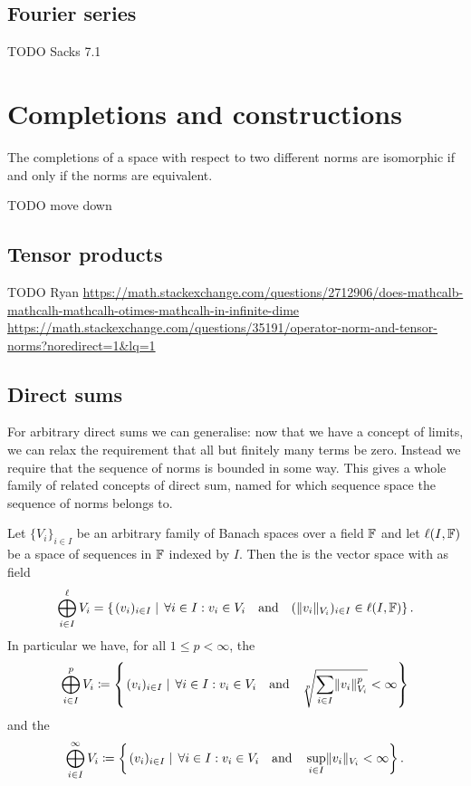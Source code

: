 \subsection{Fourier series}
TODO Sacks 7.1

\section{Completions and constructions}

\begin{proposition}
The completions of a space with respect to two different norms are isomorphic \textup{if and only if} the norms are equivalent.
\end{proposition}

TODO move down
\subsection{Tensor products}
TODO Ryan
\url{https://math.stackexchange.com/questions/2712906/does-mathcalb-mathcalh-mathcalh-otimes-mathcalh-in-infinite-dime}
\url{https://math.stackexchange.com/questions/35191/operator-norm-and-tensor-norms?noredirect=1&lq=1}

\subsection{Direct sums}

For arbitrary direct sums we can generalise: now that we have a concept of limits, we can relax the requirement that all but finitely many terms be zero. Instead we require that the sequence of norms is bounded in some way. This gives a whole family of related concepts of direct sum, named for which sequence space the sequence of norms belongs to.
\begin{definition}
Let $\{V_i\}_{i\in I}$ be an arbitrary family of Banach spaces over a field $\mathbb{F}$ and let $\ell(I,\mathbb{F})$ be a space of sequences in $\mathbb{F}$ indexed by $I$. Then the  is the vector space with as field
\[ \bigoplus_{i\in I}^\ell V_i = \left\{\left. (v_i)_{i\in I} \;\right|\; \forall i\in I: v_i\in V_i \quad\text{and}\quad (\lVert v_i\rVert_{V_i})_{i\in I}\in \ell(I,\mathbb{F})  \right\}. \]
In particular we have, for all $1\leq p<\infty$, the 
\[ \bigoplus_{i\in I}^p V_i \coloneqq \left\{\left. (v_i)_{i\in I} \;\right|\; \forall i\in I: v_i\in V_i \quad\text{and}\quad \sqrt[p]{\sum_{i\in I}\lVert v_i\rVert_{V_i}^p}<\infty \right\} \]
and the 
\[ \bigoplus_{i\in I}^\infty V_i \coloneqq \left\{\left. (v_i)_{i\in I} \;\right|\; \forall i\in I: v_i\in V_i \quad\text{and}\quad \sup_{i\in I}\lVert v_i\rVert_{V_i}<\infty \right\}. \]
\end{definition}

